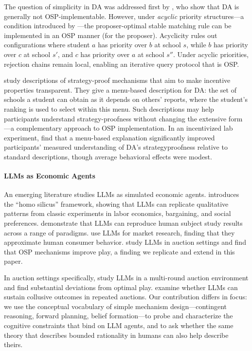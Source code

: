 \documentclass[format=acmsmall, review=false]{acmart}
\begin{document}
The question of simplicity in DA was addressed first by \citet{ashlagi2018stable}, who show that DA is generally not OSP-implementable. However, under \textit{acyclic} priority structures---a condition introduced by \citet{ergin2002efficient}---the proposer-optimal stable matching rule can be implemented in an OSP manner (for the proposer). Acyclicity rules out configurations where student $a$ has priority over $b$ at school $s$, while $b$ has priority over $c$ at school $s'$, and $c$ has priority over $a$ at school $s''$. Under acyclic priorities, rejection chains remain local, enabling an iterative query protocol that is OSP.

\citet{gonczarowski2023strategyproofness} study descriptions of strategy-proof mechanisms that aim to make incentive properties transparent. They give a menu-based description for DA: the set of schools a student can obtain as it depends on others' reports, where the student's ranking is used to select within this menu. Such descriptions may help participants understand strategy-proofness without changing the extensive form---a complementary approach to OSP implementation. In an incentivized lab experiment, \citet{gonczarowski2024describing} find that a menu-based explanation significantly improved participants' measured understanding of DA's strategyproofness relative to standard descriptions, though average behavioral effects were modest.

\paragraph{LLMs as Economic Agents}

An emerging literature studies LLMs as simulated economic agents. \citet{horton2023large} introduces the ``homo silicus'' framework, showing that LLMs can replicate qualitative patterns from classic experiments in labor economics, bargaining, and social preferences. \citet{aher2023using} demonstrate that LLMs can reproduce human subject study results across a range of paradigms. \citet{brand2023using} use LLMs for market research, finding that they approximate human consumer behavior. \citet{zhu2024evidence} study LLMs in auction settings and find that OSP mechanisms improve play, a finding we replicate and extend in this paper.

In auction settings specifically, \citet{chen2023put} study LLMs in a multi-round auction environment and find substantial deviations from optimal play. \citet{fish2024algorithmic} examine whether LLMs can sustain collusive outcomes in repeated auctions. Our contribution differs in focus: we use the conceptual vocabulary of simple mechanism design---contingent reasoning, forward planning, belief formation---to probe and characterize the cognitive constraints that bind on LLM agents, and to ask whether the same theory that describes bounded rationality in humans can also help describe theirs.
\end{document}
